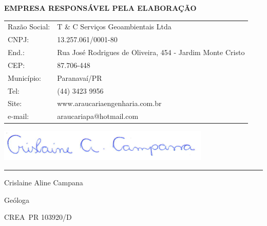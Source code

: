 \textbf{EMPRESA RESPONSÁVEL PELA ELABORAÇÃO}\\


\begin{tabular}{p{4cm} p{11cm}}
Razão Social: & T \& C Serviços Geoambientais Ltda\\
CNPJ: & 13.257.061/0001-80\\ %
End.: & Rua José Rodrigues de Oliveira, 454 - Jardim Monte Cristo\\
CEP: & 87.706-448\\
Município: & Paranavaí/PR  \\
Tel: & (44) 3423 9956  \\
Site: &  www.araucariaengenharia.com.br\\
e-mail: & araucariapa@hotmail.com \\
\end{tabular}
\vfill


\begin{minipage}[b]{0.49\textwidth}
	
	
	\includegraphics[width=\textwidth]{./imagens/assinatura digital.png}
	\vspace{-40pt}
	
	\rule{8cm}{1pt}
	
	Crislaine Aline Campana 
	
	Geóloga
	
	CREA\textendash~PR 103920/D\\
	
	
\end{minipage}

%

